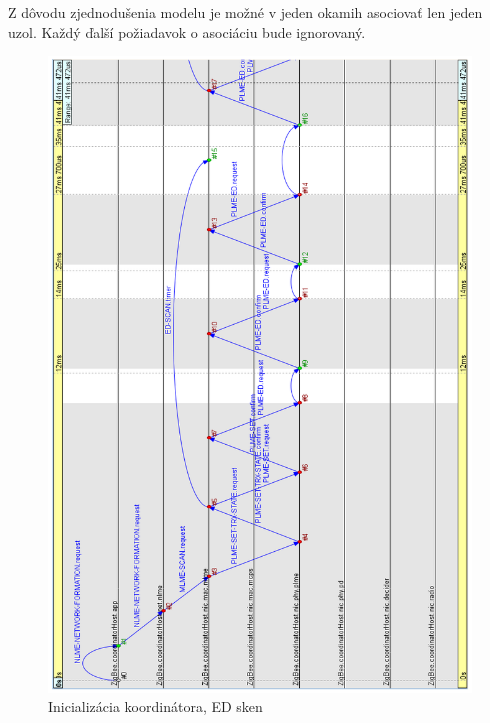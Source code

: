 {\indent Z dôvodu zjednodušenia modelu je možné v jeden okamih asociovať len jeden uzol. Každý ďalší požiadavok o asociáciu bude ignorovaný.\\
\begin{figure}[htbp]
\begin{center}
\includegraphics[width=140mm]{figures/chart_init}
\caption{Inicializácia koordinátora, ED sken}
\label{fig:chart_init}
\end{center}
\end{figure}
\begin{figure}[htbp]
\begin{center}

\end{center}
\end{figure}}
